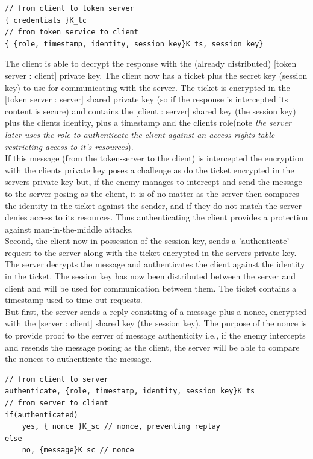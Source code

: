 \begin{lstlisting}
// from client to token server
{ credentials }K_tc
// from token service to client
{ {role, timestamp, identity, session key}K_ts, session key} 
\end{lstlisting}

The client is able to decrypt the response with the (already distributed) [token server : client] private key. The client now has a ticket plus the secret key (session key) to use for communicating with the server. The ticket is encrypted in the [token server : server] shared private key (so if the response is intercepted its content is secure) and contains the [client : server] shared key (the session key) plus the clients identity, plus a timestamp and the clients role(note \textit{the server later uses the role to authenticate the client against an access rights table restricting access to it's resources}). \\ 

If this message (from the token-server to the client) is intercepted the encryption with the clients private key poses a challenge as do the ticket encrypted in the servers private key but, if the enemy manages to intercept and send the message to the server posing as the client, it is of no matter as the server then compares the identity in the ticket against the sender, and if they do not match the server denies access to its resources. Thus authenticating the client provides a protection against man-in-the-middle attacks.\\

Second, the client now in possession of the session key, sends a 'authenticate' request to the server along with the ticket encrypted in the servers private key. The server decrypts the message and authenticates the client against the identity in the ticket. The session key has now been distributed between the server and client and will be used for communication between them. The ticket contains a timestamp used to time out requests. \\ 

But first, the server sends a reply consisting of a message plus a nonce, encrypted with the [server : client] shared key (the session key). The purpose of the nonce is to provide proof to the server of message authenticity i.e., if the enemy intercepts and resends the message posing as the client, the server will be able to compare the nonces to authenticate the message.  

\begin{lstlisting}
// from client to server
authenticate, {role, timestamp, identity, session key}K_ts 
// from server to client
if(authenticated)
	yes, { nonce }K_sc // nonce, preventing replay
else
	no, {message}K_sc // nonce
\end{lstlisting}

